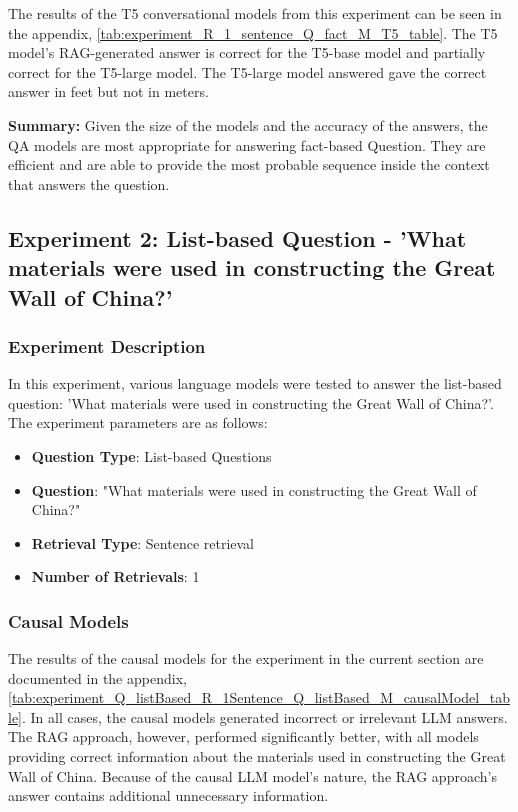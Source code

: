 \documentclass{wseas}
\begin{document}
The results of the T5 conversational models from this experiment can be seen in the appendix, \autoref{tab:experiment_R_1_sentence_Q_fact_M_T5_table}. 
The T5 model's RAG-generated answer is correct for the T5-base model and partially correct for the T5-large model. 
The T5-large model answered gave the correct answer in feet but not in meters.

\textbf{Summary:}
Given the size of the models and the accuracy of the answers, the QA models are most
appropriate for answering fact-based Question. They are efficient and are able to provide the most probable 
sequence inside the context that answers the question.

\subsection{Experiment 2: List-based Question - 'What materials were
used in constructing the Great Wall of China?'}

\subsubsection{Experiment Description}

In this experiment, various language models were tested to answer the
list-based question: 'What materials were used in constructing the
Great Wall of China?'. The experiment parameters are as follows:

\begin{itemize}
\item
  \textbf{Question Type}: List-based Questions
\item
  \textbf{Question}: "What materials were used in constructing the Great Wall of China?"
\item
  \textbf{Retrieval Type}: Sentence retrieval
\item
  \textbf{Number of Retrievals}: 1
\end{itemize}

\subsubsection{Causal Models}

The results of the causal models for the experiment in the current section are 
documented in the appendix, \autoref{tab:experiment_Q_listBased_R_1Sentence_Q_listBased_M_causalModel_table}. 
In all cases, the causal models generated incorrect or irrelevant LLM answers. 
The RAG approach, however, performed significantly better, with all models providing correct 
information about the materials used in constructing the Great Wall of China.
Because of the causal LLM model's nature, the RAG approach's answer contains additional unnecessary information.
\end{document}
